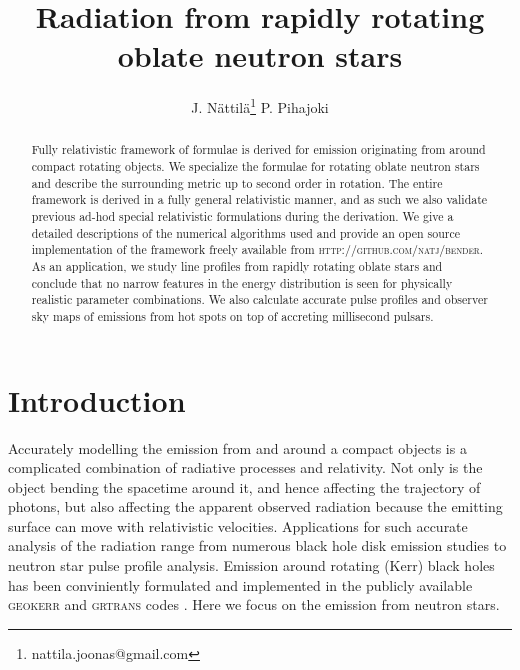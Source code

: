 \documentclass[iop, usenatbib]{emulateapj}
\begin{document}
\title{Radiation from rapidly rotating oblate neutron stars}

\author{J. N\"attil\"a\thanks{nattila.joonas@gmail.com}
  P. Pihajoki}

\affil{}


\begin{abstract}
Fully relativistic framework of formulae is derived for emission originating from around compact rotating objects.
We specialize the formulae for rotating oblate neutron stars and describe the surrounding metric up to second order in rotation.
The entire framework is derived in a fully general relativistic manner, and as such we also validate previous ad-hod special relativistic formulations during the derivation.
We give a detailed descriptions of the numerical algorithms used and provide an open source implementation of the framework freely available from \textsc{http://github.com/natj/bender}.
As an application, we study line profiles from rapidly rotating oblate stars and conclude that no narrow features in the energy distribution is seen for physically realistic parameter combinations.
We also calculate accurate pulse profiles and observer sky maps of emissions from hot spots on top of accreting millisecond pulsars.
\end{abstract}

\section{Introduction}
Accurately modelling the emission from and around a compact objects is a complicated combination of radiative processes and relativity.
Not only is the object bending the spacetime around it, and hence affecting the trajectory of photons, but also affecting the apparent observed radiation because the emitting surface can move with relativistic velocities.
Applications for such accurate analysis of the radiation range from numerous black hole disk emission studies to neutron star pulse profile analysis.
Emission around rotating (Kerr) black holes has been conviniently formulated and implemented in the publicly available \textsc{geokerr} and \textsc{grtrans} codes \citep{dexter2009, dexter2016}.
Here we focus on the emission from neutron stars. 
\end{document}
